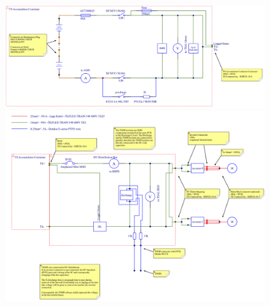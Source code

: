 \begin{figure}[h]
	\includegraphics[width=1\linewidth]{bilder/TS_schematic_akku.PNG}
	\caption[\ac{TS} Schaltplan Akku]{}
	\label{fig:tractivesystemschematic1}
	
	\includegraphics[width=1\linewidth,]{bilder/TS_Schematic_Distri.PNG}
	\caption[\ac{TS} Schaltplan \ac{HV}-Distri]{}
	\label{fig:tractivesystemschematic2}
	\end{figure}

